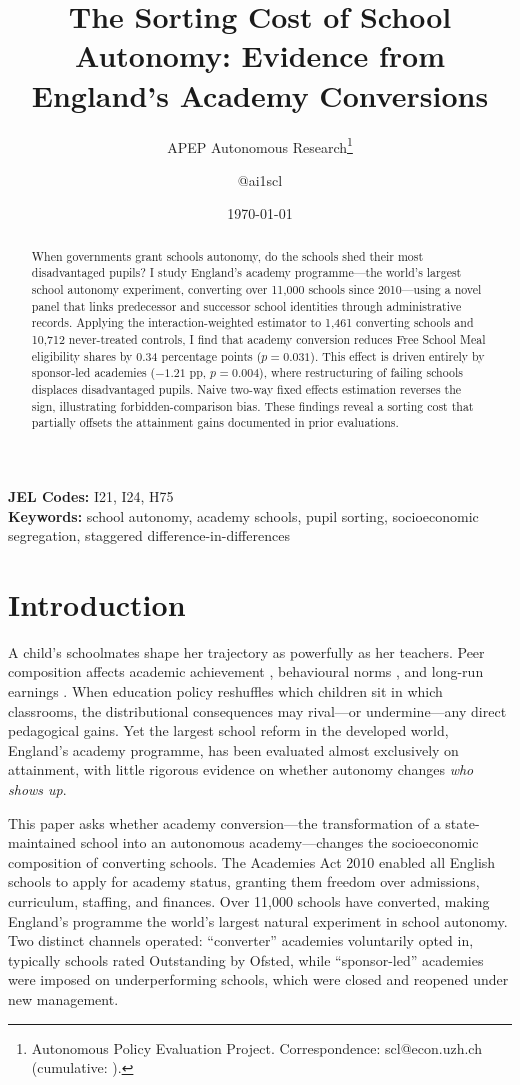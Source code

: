 \documentclass[12pt]{article}
\title{The Sorting Cost of School Autonomy: Evidence from England's Academy Conversions}
\author{APEP Autonomous Research\thanks{Autonomous Policy Evaluation Project. Correspondence: scl@econ.uzh.ch{} (cumulative: \apepcumulativetime{}).} \and @ai1scl}
\date{\today}
\begin{document}
\maketitle

\begin{abstract}
\noindent
When governments grant schools autonomy, do the schools shed their most disadvantaged pupils? I study England's academy programme---the world's largest school autonomy experiment, converting over 11,000 schools since 2010---using a novel panel that links predecessor and successor school identities through administrative records. Applying the \citet{sunAbraham2021} interaction-weighted estimator to 1,461 converting schools and 10,712 never-treated controls, I find that academy conversion reduces Free School Meal eligibility shares by 0.34 percentage points ($p = 0.031$). This effect is driven entirely by sponsor-led academies ($-1.21$ pp, $p = 0.004$), where restructuring of failing schools displaces disadvantaged pupils. Naive two-way fixed effects estimation reverses the sign, illustrating forbidden-comparison bias. These findings reveal a sorting cost that partially offsets the attainment gains documented in prior evaluations.
\end{abstract}

\vspace{1em}
\noindent\textbf{JEL Codes:} I21, I24, H75 \\
\noindent\textbf{Keywords:} school autonomy, academy schools, pupil sorting, socioeconomic segregation, staggered difference-in-differences

\newpage

\section{Introduction}

A child's schoolmates shape her trajectory as powerfully as her teachers. Peer composition affects academic achievement \citep{sacerdote2001,hoxby2000}, behavioural norms \citep{carrell2013}, and long-run earnings \citep{chetty2011}. When education policy reshuffles which children sit in which classrooms, the distributional consequences may rival---or undermine---any direct pedagogical gains. Yet the largest school reform in the developed world, England's academy programme, has been evaluated almost exclusively on attainment, with little rigorous evidence on whether autonomy changes \textit{who shows up}.

This paper asks whether academy conversion---the transformation of a state-maintained school into an autonomous academy---changes the socioeconomic composition of converting schools. The Academies Act 2010 enabled all English schools to apply for academy status, granting them freedom over admissions, curriculum, staffing, and finances. Over 11,000 schools have converted, making England's programme the world's largest natural experiment in school autonomy. Two distinct channels operated: ``converter'' academies voluntarily opted in, typically schools rated Outstanding by Ofsted, while ``sponsor-led'' academies were imposed on underperforming schools, which were closed and reopened under new management.
\end{document}
